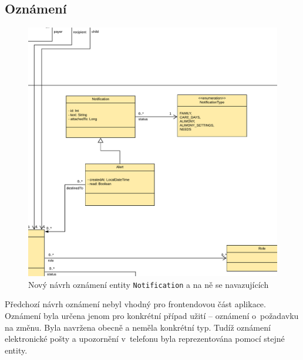     \subsection{Oznámení}\label{navrh:upravy:notification}
        \begin{figure}\centering
	       \includegraphics[width=1.0\textwidth]{pdfs/Notification2}
	       \caption[Nový návrh oznámení]{Nový návrh oznámení entity \texttt{Notification} a na ně se navazujících}\label{image:notification2}
        \end{figure}
        Předchozí návrh oznámení nebyl vhodný pro frontendovou část aplikace. Oznámení byla určena jenom pro konkrétní případ užití -- oznámení o~požadavku na změnu. Byla navržena obecně a neměla konkrétní typ. Tudíž oznámení elektronické pošty a upozornění v~telefonu byla reprezentována pomocí stejné entity.
        
